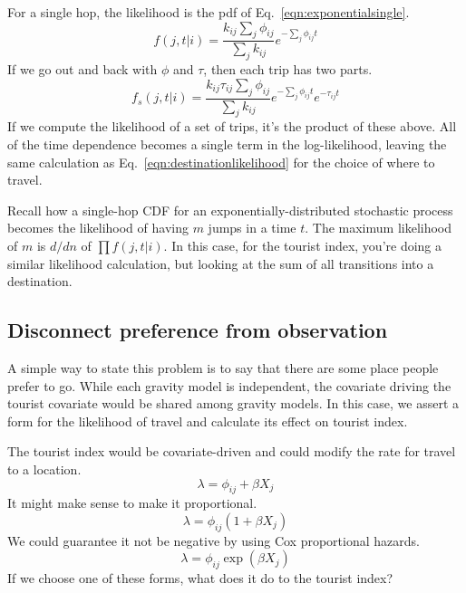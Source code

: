 \documentclass{article}
\begin{document}
For a single hop, the likelihood is the pdf of Eq.~\ref{eqn:exponentialsingle}.
\begin{equation}
  f(j, t|i) = \frac{k_{ij}\sum_j\phi_{ij}}{\sum_jk_{ij}} e^{-\sum_j\phi_{ij}t}\label{eqn:pdfsingle}
\end{equation}
If we go out and back with $\phi$ and $\tau$, then each trip has two parts.
\begin{equation}
  f_s(j, t|i) = \frac{k_{ij}\tau_{ij}\sum_j\phi_{ij}}{\sum_jk_{ij}} e^{-\sum_j\phi_{ij}t}e^{-\tau_{ij}t}\label{eqn:pdfsimple}
\end{equation}
If we compute the likelihood of a set of trips, it's the product of these above. All of the time dependence becomes a single term in the log-likelihood, leaving the same calculation as Eq.~\ref{eqn:destinationlikelihood} for the choice of where to travel.

Recall how a single-hop CDF for an exponentially-distributed stochastic process becomes the likelihood of having $m$ jumps in a time $t$. The maximum likelihood of $m$ is $d/dn$ of $\prod f(j,t|i)$. In this case, for the tourist index, you're doing a similar likelihood calculation, but looking at the sum of all transitions into a destination.


\subsection{Disconnect preference from observation}

A simple way to state this problem is to say that there are some place people prefer to go. While each gravity model is independent, the covariate driving the tourist covariate would be shared among gravity models. In this case, we assert a form for the likelihood of travel and calculate its effect on tourist index.

The tourist index would be covariate-driven and could modify the rate for travel to a location.
\begin{equation}
  \lambda = \phi_{ij} + \beta X_{j}
\end{equation}
It might make sense to make it proportional.
\begin{equation}
  \lambda = \phi_{ij}(1 + \beta X_{j})
\end{equation}
We could guarantee it not be negative by using Cox proportional hazards.
\begin{equation}
  \lambda = \phi_{ij}\exp\left(\beta X_{j}\right)
\end{equation}
If we choose one of these forms, what does it do to the tourist index?
\end{document}
